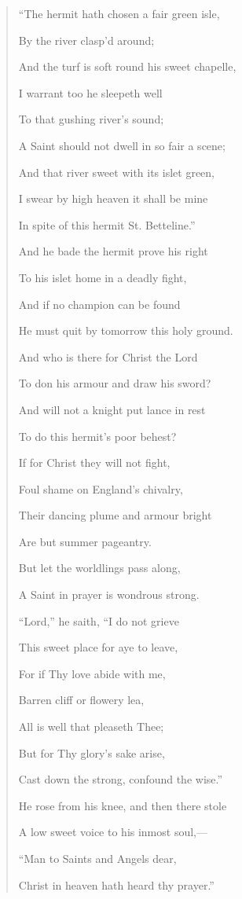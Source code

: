 \begin{quote}
``The hermit hath chosen a fair green isle,

By the river clasp'd around;

And the turf is soft round his sweet chapelle,

I warrant too he sleepeth well

To that gushing river's sound;

A Saint should not dwell in so fair a scene;

And that river sweet with its islet green,

I swear by high heaven it shall be mine

In spite of this hermit St. Betteline.''

And he bade the hermit prove his right

To his islet home in a deadly fight,

And if no champion can be found

He must quit by tomorrow this holy ground.

And who is there for Christ the Lord

To don his armour and draw his sword?

And will not a knight put lance in rest

To do this hermit's poor behest?

If for Christ they will not fight,

Foul shame on England's chivalry,

Their dancing plume and armour bright

Are but summer pageantry.

But let the worldlings pass along,

A Saint in prayer is wondrous strong.

``Lord,'' he saith, ``I do not grieve

This sweet place for aye to leave,

For if Thy love abide with me,

Barren cliff or flowery lea,

All is well that pleaseth Thee;

But for Thy glory's sake arise,

Cast down the strong, confound the wise.''

He rose from his knee, and then there stole

A low sweet voice to his inmost soul,—

``Man to Saints and Angels dear,

Christ in heaven hath heard thy prayer.''


\end{quote}

